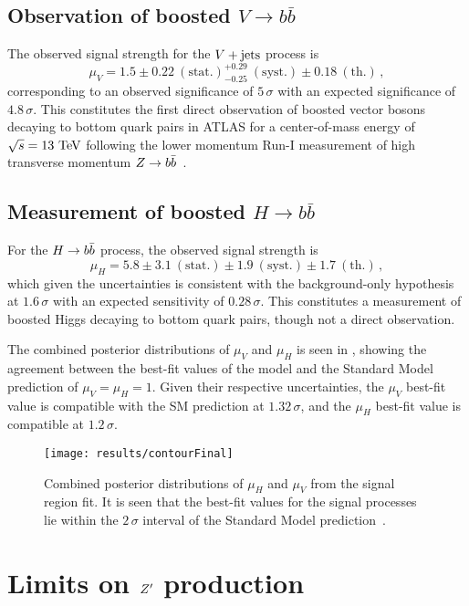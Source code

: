 \subsection{Observation of boosted $V\to b\bar{b}$}

The observed signal strength for the $V + \text{jets}$ process is
\[
 \mu_{V} = 1.5 \pm 0.22~\mathrm{(stat.)}^{+0.29}_{-0.25}~\mathrm{(syst.)} \pm 0.18~\mathrm{(th.)}\,,
\]
corresponding to an observed significance of $5\,\sigma$ with an expected significance of $4.8\,\sigma$.
This constitutes the first direct observation of boosted vector bosons decaying to bottom quark pairs in ATLAS for a center-of-mass energy of $\sqrt{s}=13~\mathrm{TeV}$ following the lower momentum Run-I measurement of high transverse momentum $Z \to b\bar{b}$~\cite{STDM-2013-04}.

\subsection{Measurement of boosted $H\to b\bar{b}$}
For the $H \to b\bar{b}$ process, the observed signal strength is
\[
 \mu_{H} = 5.8 \pm 3.1~\mathrm{(stat.)} \pm 1.9~\mathrm{(syst.)} \pm 1.7~\mathrm{(th.)}\,,
\]
which given the uncertainties is consistent with the background-only hypothesis at $1.6\,\sigma$ with an expected sensitivity of $0.28\,\sigma$.
This constitutes a measurement of boosted Higgs decaying to bottom quark pairs, though not a direct observation.

The combined posterior distributions of $\mu_{V}$ and $\mu_{H}$ is seen in , showing the agreement between the best-fit values of the model and the Standard Model prediction of $\mu_{V} = \mu_{H} = 1$.
Given their respective uncertainties, the $\mu_{V}$ best-fit value is compatible with the SM prediction at $1.32\,\sigma$, and the $\mu_{H}$ best-fit value is compatible at $1.2\,\sigma$.

\begin{figure}[htbp]
 \centering
 \texttt{[image: results/contourFinal]}
 \caption[Compatibility of best-fit values for $\mu_{H}$ and $\mu_{V}$ with Standard Model predicted values.]{%
  Combined posterior distributions of $\mu_{H}$ and $\mu_{V}$ from the signal region fit.
  It is seen that the best-fit values for the signal processes lie within the $2\,\sigma$ interval of the Standard Model prediction~\cite{ATLAS-CONF-2018-052}.}
 \label{fig:signal_strength_contour}
\end{figure}
\clearpage

\section{Limits on $Z'$ production}

